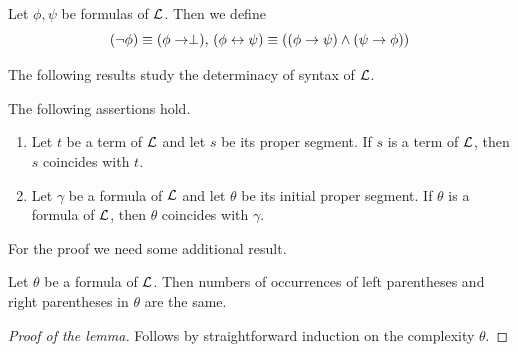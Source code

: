 \documentclass[10pt]{amsart}
\begin{document}
\begin{remark}\label{remark:negation_and_equivalence}
	Let $\phi,\psi$ be formulas of ${\mathcal L}$. Then we define
	$$(\neg \phi) \equiv (\phi \rightarrow \perp),\,(\phi \leftrightarrow \psi) \equiv \left((\phi \rightarrow \psi) \wedge (\psi \rightarrow \phi)\right)$$
\end{remark}
\noindent
The following results study the determinacy of syntax of ${\mathcal L}$.

\begin{theorem}\label{theorem:unique_readability_of_initial_segments}
	The following assertions hold.
	\begin{enumerate}[label=\emph{\textbf{(\arabic*)}}, leftmargin=3.0em]
		\item Let $t$ be a term of ${\mathcal L}$ and let $s$ be its proper segment. If $s$ is a term of ${\mathcal L}$, then $s$ coincides with $t$.
		\item Let $\gamma$ be a formula of ${\mathcal L}$ and let $\theta$ be its initial proper segment. If $\theta$ is a formula of ${\mathcal L}$, then $\theta$ coincides with $\gamma$.
	\end{enumerate}
\end{theorem}
\noindent
For the proof we need some additional result.

\begin{lemma}\label{lemma:left_and_right_parentheses_match_in_formula}
	Let $\theta$ be a formula of ${\mathcal L}$. Then numbers of occurrences of left parentheses and right parentheses in $\theta$ are the same.
\end{lemma}
\begin{proof}[Proof of the lemma]
	Follows by straightforward induction on the complexity $\theta$.
\end{proof}
\end{document}
